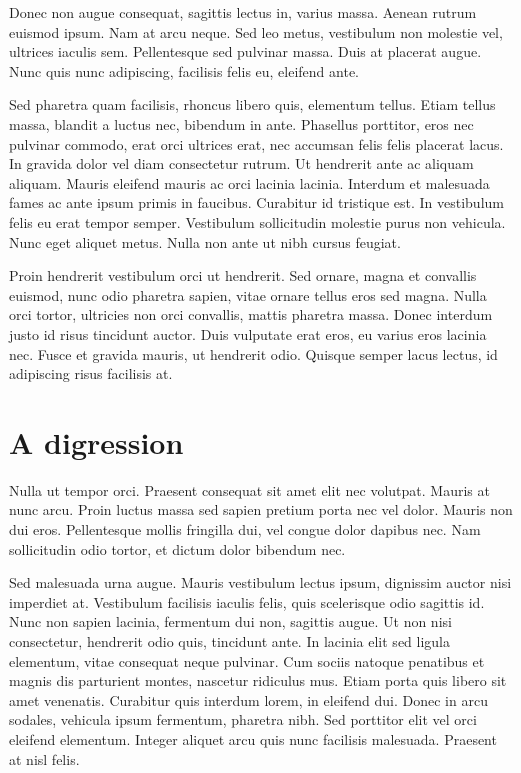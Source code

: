 \documentclass[11pt,a4paper]{memoir}\usepackage[]{graphicx}\usepackage[]{color}
\begin{document}
Donec non augue consequat, sagittis lectus in, varius massa. Aenean rutrum euismod ipsum. Nam at arcu neque. Sed leo metus, vestibulum non molestie vel, ultrices iaculis sem. Pellentesque sed pulvinar massa. Duis at placerat augue. Nunc quis nunc adipiscing, facilisis felis eu, eleifend ante.

Sed pharetra quam facilisis, rhoncus libero quis, elementum tellus. Etiam tellus massa, blandit a luctus nec, bibendum in ante. Phasellus porttitor, eros nec pulvinar commodo, erat orci ultrices erat, nec accumsan felis felis placerat lacus. In gravida dolor vel diam consectetur rutrum. Ut hendrerit ante ac aliquam aliquam. Mauris eleifend mauris ac orci lacinia lacinia. Interdum et malesuada fames ac ante ipsum primis in faucibus. Curabitur id tristique est. In vestibulum felis eu erat tempor semper. Vestibulum sollicitudin molestie purus non vehicula. Nunc eget aliquet metus. Nulla non ante ut nibh cursus feugiat.

Proin hendrerit vestibulum orci ut hendrerit. Sed ornare, magna et convallis euismod, nunc odio pharetra sapien, vitae ornare tellus eros sed magna. Nulla orci tortor, ultricies non orci convallis, mattis pharetra massa. Donec interdum justo id risus tincidunt auctor. Duis vulputate erat eros, eu varius eros lacinia nec. Fusce et gravida mauris, ut hendrerit odio. Quisque semper lacus lectus, id adipiscing risus facilisis at.

\section{A digression}
Nulla ut tempor orci. Praesent consequat sit amet elit nec volutpat. Mauris at nunc arcu. Proin luctus massa sed sapien pretium porta nec vel dolor. Mauris non dui eros. Pellentesque mollis fringilla dui, vel congue dolor dapibus nec. Nam sollicitudin odio tortor, et dictum dolor bibendum nec.

Sed malesuada urna augue. Mauris vestibulum lectus ipsum, dignissim auctor nisi imperdiet at. Vestibulum facilisis iaculis felis, quis scelerisque odio sagittis id. Nunc non sapien lacinia, fermentum dui non, sagittis augue. Ut non nisi consectetur, hendrerit odio quis, tincidunt ante. In lacinia elit sed ligula elementum, vitae consequat neque pulvinar. Cum sociis natoque penatibus et magnis dis parturient montes, nascetur ridiculus mus. Etiam porta quis libero sit amet venenatis. Curabitur quis interdum lorem, in eleifend dui. Donec in arcu sodales, vehicula ipsum fermentum, pharetra nibh. Sed porttitor elit vel orci eleifend elementum. Integer aliquet arcu quis nunc facilisis malesuada. Praesent at nisl felis.
\end{document}
